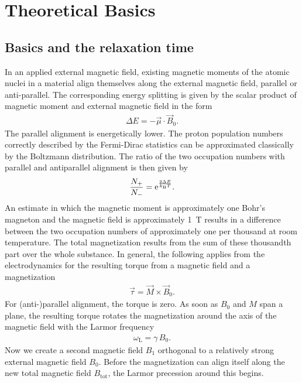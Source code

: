 \section{Theoretical Basics}



\subsection{Basics and the relaxation time}
In an applied external magnetic field, existing magnetic moments of the atomic nuclei in a material align themselves along the external magnetic field, parallel or anti-parallel.
The corresponding energy splitting is given by the scalar product of magnetic moment and external magnetic field in the form
\begin{align}
\Delta E=-\vec{\mu}\cdot\vec{B}_0.
\end{align}
The parallel alignment is energetically lower.
The proton population numbers correctly described by the Fermi-Dirac statistics can be approximated classically by the Boltzmann distribution.
The ratio of the two occupation numbers with parallel and antiparallel alignment is then given by
\begin{align}
\frac{N_+}{N_-}=\mathrm{e}^{\frac{2\Delta E}{k_\text{B}T}}.
\end{align}
An estimate in which the magnetic moment is approximately one Bohr's magneton and the magnetic field is approximately \SI{1}{\tesla} results in a difference between the two occupation numbers of approximately one per thousand at room temperature.
The total magnetization results from the sum of these thousandth part over the whole substance.
In general, the following applies from the electrodynamics for the resulting torque from a magnetic field and a magnetization
\begin{align}
\vec{\tau}=\vec{M}\times\vec{B}_0.
\end{align}
For (anti-)parallel alignment, the torque is zero.
As soon as $B_0$ and $M$ span a plane, the resulting torque rotates the magnetization around the axis of the magnetic field with the Larmor frequency
\begin{align}
\omega_\text{L}=\gamma\,B_0.
\end{align}
Now we create a second magnetic field $B_1$ orthogonal to a relatively strong external magnetic field $B_0$.
Before the magnetization can align itself along the new total magnetic field $B_\text{tot}$, the Larmor precession around this begins.
